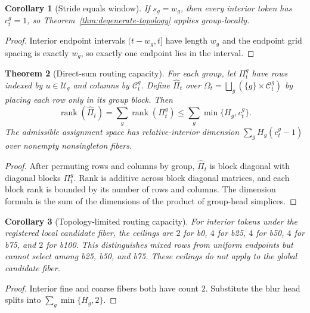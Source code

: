 \documentclass{article}
\theoremstyle{plain}
\newtheorem{theorem}{Theorem}[section]
\newtheorem{corollary}[theorem]{Corollary}
\theoremstyle{definition}
\theoremstyle{remark}
\begin{document}
\begin{corollary}[Stride equals window]
\label{cor:stride-equals-window}
If $s_g=w_g$, then every interior token has $c_t^g=1$, so Theorem~\ref{thm:degenerate-topology} applies group-locally.
\end{corollary}
\begin{proof}
Interior endpoint intervals $(t-w_g,t]$ have length $w_g$ and the endpoint grid spacing is exactly $w_g$, so exactly one endpoint lies in the interval.
\end{proof}

\begin{theorem}[Direct-sum routing capacity]
\label{thm:direct-sum-routing-capacity}
For each group, let $\Pi_t^g$ have rows indexed by $u\in\mathcal U_g$ and columns by $\mathcal C_t^g$.  Define $\widehat\Pi_t$ over $\Omega_t=\bigsqcup_g(\{g\}\times\mathcal C_t^g)$ by placing each row only in its group block.  Then
\begin{equation}
\operatorname{rank}(\widehat\Pi_t)=\sum_g\operatorname{rank}(\Pi_t^g)\le\sum_g\min\{H_g,c_t^g\}.
\end{equation}
The admissible assignment space has relative-interior dimension $\sum_g H_g(c_t^g-1)$ over nonempty nonsingleton fibers.
\end{theorem}
\begin{proof}
After permuting rows and columns by group, $\widehat\Pi_t$ is block diagonal with diagonal blocks $\Pi_t^g$.  Rank is additive across block diagonal matrices, and each block rank is bounded by its number of rows and columns.  The dimension formula is the sum of the dimensions of the product of group-head simplices.
\end{proof}

\begin{corollary}[Topology-limited routing capacity]
\label{cor:topology-limited-routing-capacity}
For interior tokens under the registered local candidate fiber, the ceilings
are $2$ for b0, $4$ for b25, $4$ for b50, $4$ for b75, and $2$ for b100.
This distinguishes mixed rows from uniform endpoints but cannot select among
b25, b50, and b75.  These ceilings do not apply to the global candidate fiber.
\end{corollary}
\begin{proof}
Interior fine and coarse fibers both have count $2$.  Substitute the blur head splits into $\sum_g\min\{H_g,2\}$.
\end{proof}
\end{document}
